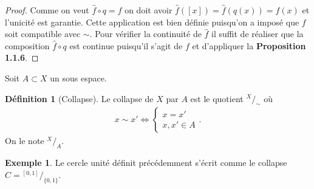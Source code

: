 \documentclass[12pt]{book}
\theoremstyle{definition}
\newtheorem{definition}[lemma]{Définition}
\newtheorem{example}[lemma]{Exemple}
\theoremstyle{remark}
\newcommand*\quot[2]{{^{\textstyle #1}\big/_{\textstyle #2}}}
\begin{document}
	\begin{proof}
		Comme on veut $\hat{f}\circ q = f$ on doit avoir $\hat{f}([x]) = \hat{f}(q(x)) = f(x)$ et l'unicité est garantie. Cette application est bien définie puisqu'on a imposé que $f$ soit compatible avec $\sim$. Pour vérifier la continuité de $\hat{f}$ il suffit de réaliser que la composition $\hat{f} \circ q$ est continue puisqu'il s'agit de $f$ et d'appliquer la \textbf{Proposition 1.1.6}. 

	\end{proof}
	Soit $A\subset X$ un sous espace.
	\begin{definition}[Collapse]
		Le collapse de $X$ par $A$ est le quotient $\quot{X}{\sim}$ où
		 \begin{align*}
			x \sim x' \iff \begin{cases}
				x=x' \\
				x,x' \in A
			\end{cases}
		.\end{align*}
		On le note $\quot{X}{A}$.
	\end{definition}
	\begin{example}
		Le cercle unité définit précédemment s'écrit comme le collapse $C = \quot{[0,1]}{\{0,1\}}$.
	\end{example}
\end{document}
